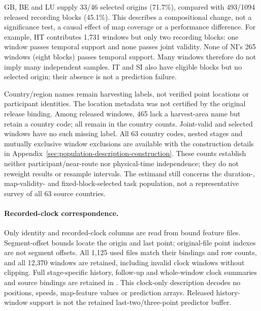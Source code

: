 GB, BE and LU supply 33/46 selected origins (71.7\%), compared with 493/1094
released recording blocks (45.1\%). This describes a compositional change,
not a significance test, a causal effect of map coverage or a performance
difference. For example, HT contributes 1,731 windows but only two recording
blocks: one window passes temporal support and none passes joint validity.
None of NI's 265 windows (eight blocks) passes temporal support.
Many windows therefore do not imply many independent samples.
IT and SI also have eligible blocks but no selected origin; their absence
is not a prediction failure.

Country/region names remain harvesting labels, not verified point locations
or participant identities. The location metadata was not certified by the
original release binding. Among released windows, 465 lack a harvest-area
name but retain a country code; all remain in the country counts.
Joint-valid and selected windows have no such missing label.
All 63 country codes, nested stages and mutually exclusive window exclusions
are available with the construction details in
Appendix~\ref{sec:population-description-construction}.
These counts establish neither participant/near-route nor physical-time
independence; they do not reweight results or resample intervals.
The estimand still concerns the duration-, map-validity- and fixed-block-selected
task population, not a representative survey of all 63 source countries.

\paragraph{Recorded-clock correspondence.}
Only identity and recorded-clock columns are read from bound feature files.
Segment-offset bounds locate the origin and last point; original-file point
indexes are not segment offsets. All 1,125 used files match their bindings
and row counts, and all 12,370 windows are retained, including invalid clock
windows without clipping. Full stage-specific history, follow-up and
whole-window clock summaries and source bindings are retained in
.
This clock-only description decodes no positions, speeds, map-feature values
or prediction arrays. Released history-window support is not the retained
last-two/three-point predictor buffer.

